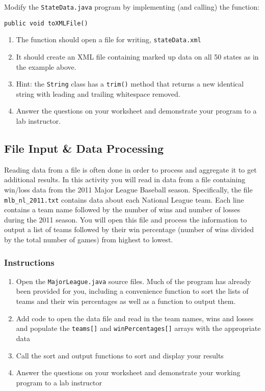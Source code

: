 \documentclass[12pt]{scrartcl}
\begin{document}
Modify the \texttt{StateData.java} program by implementing 
(and calling) the function:

\texttt{public void toXMLFile()}

\begin{enumerate}
  \item The function should open a file for writing, \texttt{stateData.xml}
  \item It should create an XML file containing marked up data on all 50 states 
	as in the example above.  
  \item Hint: the \texttt{String} class has a \texttt{trim()} method
  	that returns a new identical string with leading and trailing whitespace removed.
  \item Answer the questions on your worksheet and demonstrate your program 
	to a lab instructor.
\end{enumerate}
	
\subsection{File Input \& Data Processing}

Reading data from a file is often done in order to process and aggregate it to 
get additional results.  In this activity you will read in data from a file containing 
win/loss data from the 2011 Major League Baseball season.  Specifically, the 
file \texttt{mlb_nl_2011.txt} contains data about each National League 
team.  Each line contains a team name followed by the number of wins and 
number of losses during the 2011 season.  You will open this file and process 
the information to output a list of teams followed by their win percentage 
(number of wins divided by the total number of games) from highest to lowest.

\subsubsection*{Instructions}

\begin{enumerate}
  \item Open the \texttt{MajorLeague.java} source files.  Much of the program 
  	has already been provided for you, including a convenience function to 
	sort the lists of teams and their win percentages as well as a function 
	to output them.
  \item Add code to open the data file and read in the team names, wins and 
	losses and populate the \texttt{teams[]} and \texttt{winPercentages[]} 
	arrays with the appropriate data
  \item Call the sort and output functions to sort and display your results
  \item Answer the questions on your worksheet and demonstrate your working 
  	program to a lab instructor
\end{enumerate}
\end{document}
